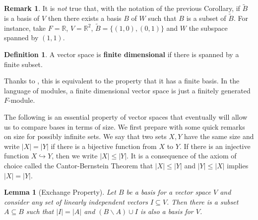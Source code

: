 \documentclass[12pt]{report}
\newtheorem{lemma}[theorem]{Lemma}
\numberwithin{equation}{section}
\numberwithin{theorem}{chapter}
\theoremstyle{definition}
\newtheorem{definition}[theorem]{Definition}
\newtheorem*{basic properties}{Basic Properties}
\newtheorem*{Important Remark}{Important Remark}
\newtheorem{remark}[theorem]{Remark}
\newcommand{\df}[1]{{\bf #1}\index{#1}}
\begin{document}
\begin{remark} 
It is {\em not} true that, with the notation of the previous Corollary, if $\tilde{B}$ is a basis of $V$ then there exists a basis $B$ of $W$ such that $B$ is a subset of $\tilde{B}$. For instance, take $F = \mathbb{R}$, $V = \mathbb{R}^2$, $\tilde{B} = \{(1,0), (0,1)\}$ and $W$ the subspace spanned by $(1,1)$. 
  \end{remark}






\begin{definition}
A vector space is \df{finite dimensional} if there is spanned by a finite subset. 
\end{definition}

Thanks to , this is equivalent to the property that it has a finite basis. In the language of modules, a finite dimensional vector space is just a finitely generated $F$-module.

The following is an essential property of vector spaces that eventually will allow us to compare bases in terms of size. We first prepare with some quick remarks on size for possibly infinite sets. We say that two sets $X,Y$ have the same size and write $|X|=|Y|$ if there is a bijective function from $X$ to $Y$. If there is an injective function $X \hookrightarrow Y$, then we write $|X|\leq |Y|$. It is a consequence of the axiom of choice called the Cantor-Bernstein Theorem that $|X|\leq |Y|$ and $|Y|\leq |X|$ implies $|X|=|Y|$.

\begin{lemma}[Exchange Property]\label{lem:replacement}
 Let $B$ be a basis for a vector space $V$ and consider any set of linearly independent vectors $I \subseteq V$. Then there is a subset $A \subseteq B$ such that $|I|=|A|$ and
 $(B \smallsetminus A) \cup I$ is also a basis for $V$. 
\end{lemma}
\end{document}
